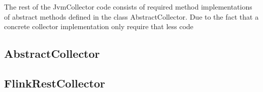 The rest of the JvmCollector code consists of required method implementations of abstract methods defined in the class
AbstractCollector. Due to the fact that a concrete collector implementation only require that less code









\subsection{AbstractCollector}

\subsection{FlinkRestCollector}

%

%
%
%
%
